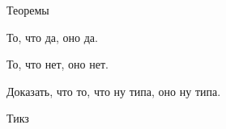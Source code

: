 \begin{frame}{Теоремы}
\begin{thm}[Безымянного]
	То, что да, оно да.
\end{thm}

\begin{lm}
	То, что нет, оно нет.
\end{lm}

\begin{task}
	Доказать, что то, что ну типа, оно ну типа.
\end{task}
\end{frame}


\begin{frame}{Тикз}
	\begin{center} \end{center}
\end{frame}
